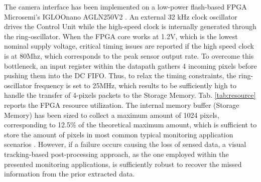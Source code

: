 \documentclass[journal]{IEEEtran}
\begin{document}
The camera interface has been implemented on a low-power flash-based FPGA Microsemi's IGLOOnano AGLN250V2 \cite{IGLOO}.
An external 32 kHz clock oscillator drives the Control Unit while the high-speed clock is internally generated through the ring-oscillator.
When the FPGA core works at 1.2V, which is the lowest nominal supply voltage, critical timing issues are reported if the high speed clock is at 80Mhz, which corresponds to the peak sensor output rate.
To overcome this bottleneck, an input register within the datapath gathers 4 incoming pixels before pushing them into the DC FIFO. 
Thus, to relax the timing constraints, the ring-oscillator frequency is set to 25MHz, which results to be sufficiently high to handle the transfer of 4-pixels packets to the Storage Memory. Tab. \ref{tab:resource} reports the FPGA resource utilization.
The internal memory buffer (Storage Memory) has been sized to collect a maximum amount of 1024 pixels, corresponding to 12.5\% of the theoretical maximum amount, which is sufficient to store the amount of pixels in most common typical monitoring application scenarios \cite{Rusci2016}. However, if a failure occurs causing the loss of sensed data, a visual tracking-based post-processing approach, as the one employed within the presented monitoring applications, is sufficiently robust to recover the missed information from the prior extracted data.
\end{document}
